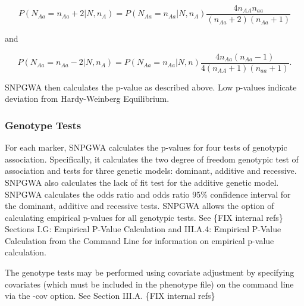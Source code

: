 \begin{equation*}
  P(N_{Aa} = n_{Aa}+2|N,n_A) = P(N_{Aa}=n_{Aa} |N,n_A)\frac{4n_{AA}n_{aa}}{(n_{Aa}+2)(n_{Aa}+1)}
\end{equation*}

\noindent{}and

\begin{equation*}
  P(N_{Aa}=n_{Aa}-2|N,n_A) = P(N_{Aa}=n_{Aa}|N,n)\frac{4n_{Aa}(n_{Aa}-1)}{4(n_{AA}+1)(n_{aa}+1)}.
\end{equation*}

\noindent{}SNPGWA then calculates the p-value as described above.  Low p-values indicate
deviation from Hardy-Weinberg Equilibrium.

\subsubsection{Genotype Tests}
For each marker, SNPGWA calculates the p-values for four tests of genotypic
association.  Specifically, it calculates the two degree of freedom genotypic
test of association and tests for three genetic models: dominant, additive and
recessive.  SNPGWA also calculates the lack of fit test for the additive genetic
model.  SNPGWA calculates the odds ratio and odds ratio 95\% confidence interval
for the dominant, additive and recessive tests.  SNPGWA allows the option of
calculating empirical p-values for all genotypic tests.  See \{FIX internal
refs\} Sections I.G: Empirical P-Value Calculation and III.A.4: Empirical
P-Value Calculation from the Command Line for information on empirical p-value
calculation.

The genotype tests may be performed using covariate adjustment by specifying
covariates (which must be included in the phenotype file) on the command line
via the -cov option.  See Section III.A.  \{FIX internal refs\}

